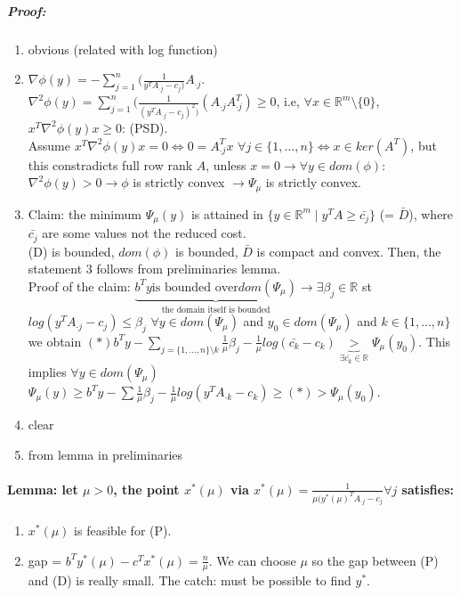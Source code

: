 \documentclass[main]{subfiles}
\begin{document}
\subparagraph{Proof:}
\begin{enumerate}
\item obvious (related with log function)
\item $\nabla \phi(y) = - \sum_{j = 1}^{n} (\frac{1}{y^T A_{\cdot j} - c_j)}
A_{\cdot j}$.\\
$\nabla^2 \phi(y) = \sum_{j = 1}^{n} (\frac{1}{(y^T A_{\cdot j} - c_j)^2)}
(A_{\cdot j} A_{\cdot j}^T) \geq 0$, i.e, $\forall x \in \mathbb{R}^m\setminus
\{0\}$, $x^T \nabla^2 \phi(y) x \geq 0$: (PSD).\\
Assume $x^T \nabla^2 \phi(y)x = 0 \iff 0 = A_{\cdot j}^T x$ $\forall j \in
\{1, \dots, n\} \iff x \in ker(A^T)$, but this constradicts full row rank $A$,
unless $x = 0 \rightarrow \forall y \in dom(\phi)$: $\nabla^2 \phi(y) > 0
\rightarrow \phi$ is strictly convex $\rightarrow \Psi_\mu$ is strictly convex.
\item Claim: the minimum $\Psi_\mu(y)$ is attained in $\{y \in \mathbb{R}^m
\mid y^T A \geq \bar{c_j } \}$ (= $\bar{D}$), where $\bar{c_j}$ are some values
not the reduced cost.\\
(D) is bounded, $dom(\phi)$ is bounded, $\bar{D}$ is compact and convex. Then,
the statement 3 follows from preliminaries lemma.\\
Proof of the claim: $\underbrace{b^T y \text{is bounded over}
dom(\Psi_\mu)}_{\text{the domain itself is bounded}} \rightarrow \exists
\beta_j \in \mathbb{R}$ st $log(y^T A_{\cdot j} - c_j) \leq \beta_j$
$\forall y \in dom(\Psi_\mu)$ and $y_0 \in dom(\Psi_\mu)$ and
$k \in \{1, \dots, n\}$ we obtain $(*) b^T y - \sum_{j = \{1, \dots, n\}
\setminus k} \frac{1}{\mu} \beta_j - \frac{1}{\mu} log(\bar{c_k} - c_k)
\underbrace{>}_{\exists \bar{c_k}
\in \mathbb{R}} \Psi_\mu(y_0)$. This implies $\forall y \in dom(\Psi_\mu)$
$\Psi_\mu(y) \geq b^T y - \sum \frac{1}{\mu} \beta_j - \frac{1}{\mu} log(y^T
A_{\cdot k} - c_k) \geq (*) > \Psi_\mu(y_0)$.
\item clear
\item from lemma in preliminaries
\end{enumerate}

\paragraph{Lemma: let $\mu > 0$, the point $x^*(\mu)$ via $x^*(\mu) = \frac{1}
{\mu (y^*(\mu)^T A_{\cdot j} - c_j} \forall j$ satisfies:}

\begin{enumerate}
\item $x^*(\mu)$ is feasible for (P).
\item gap = $b^T y^*(\mu) - c^T x^*(\mu) = \frac{n}{\mu}$. We can choose $\mu$
so the gap between (P) and (D) is really small. The catch: must be possible to
find $y^*$.
\end{enumerate}
\end{document}
